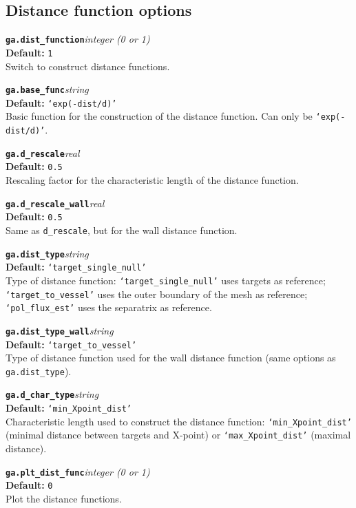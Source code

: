 \documentclass[10pt,a4paper]{article}
\newcommand{\sw}[4]{%
  \par\vspace{0.7em}%
  \begin{minipage}{\linewidth}\raggedright
    \textbf{\texttt{#1}}\hfill\textit{#2}\\[0.1em]
    \textbf{Default:} #3\\[0.1em]
    #4\par
    \vspace{0.3em}{\color{swgrey}\hrule}
  \end{minipage}\par}
\begin{document}
\subsection*{Distance function options}
\sw{ga.dist_function}{integer (0 or 1)}{\texttt{1}}{Switch to construct distance functions.}
\sw{ga.base_func}{string}{\texttt{`exp(-dist/d)'}}{Basic function for the construction of the distance function. Can only be \texttt{`exp(-dist/d)'}.}
\sw{ga.d_rescale}{real}{\texttt{0.5}}{Rescaling factor for the characteristic length of the distance function.}
\sw{ga.d_rescale_wall}{real}{\texttt{0.5}}{Same as \texttt{d\_rescale}, but for the wall distance function.}
\sw{ga.dist_type}{string}{\texttt{`target\_single\_null'}}{Type of distance function: \texttt{`target\_single\_null'} uses targets as reference; \texttt{`target\_to\_vessel'} uses the outer boundary of the mesh as reference; \texttt{`pol\_flux\_est'} uses the separatrix as reference.}
\sw{ga.dist_type_wall}{string}{\texttt{`target\_to\_vessel'}}{Type of distance function used for the wall distance function (same options as \texttt{ga.dist\_type}).}
\sw{ga.d_char_type}{string}{\texttt{`min\_Xpoint\_dist'}}{Characteristic length used to construct the distance function: \texttt{`min\_Xpoint\_dist'} (minimal distance between targets and X-point) or \texttt{`max\_Xpoint\_dist'} (maximal distance).}
\sw{ga.plt_dist_func}{integer (0 or 1)}{\texttt{0}}{Plot the distance functions.}
\end{document}
